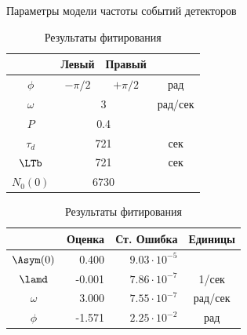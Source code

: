 \documentclass{report}
\newcommand{\vp}[2]{{#1}\cdot 10^{#2}}
\newcommand{\LTd}{\tau_d}
\begin{document}
\begin{table}[h]
  \begin{minipage}[t]{.5\linewidth}
    \centering
    \caption{Параметры модели частоты событий детекторов\label{tbl:DetCntRtParam}}
    \begin{tabular}[t]{cccc}
      \hline
      &   Левый   &     Правый     &  \\ \hline
      $\phi$  & $-\pi/2$ &   $+\pi/2$    &   рад   \\
      $\omega$ &  \multicolumn{2}{c}{3}   & рад/сек \\
      $P$    & \multicolumn{2}{c}{0.4}  &  \\
      $\LTd$  & \multicolumn{2}{c}{721}  &   сек   \\
      $\LTb$  & \multicolumn{2}{c}{721}  &   сек   \\
      $N_0(0)$ & \multicolumn{2}{c}{6730} &  \\ \hline
    \end{tabular}
  \end{minipage}%
  \begin{minipage}[t]{.5\linewidth}
    \centering
    \caption{Результаты фитирования\label{tbl:FitRes}}
    \begin{tabular}[t]{crrc}
      \hline
      & Оценка &             Ст. Ошибка &  Единицы   \\ \hline
      $\Asym(0)$ &   0.400 & $\vp{9.03}{-5}$ &         \\
      $\lamd$   &  -0.001 & $\vp{7.86}{-7}$ &  1/сек  \\
      $\omega$  &   3.000 & $\vp{7.55}{-7}$ & рад/сек \\
      $\phi$   &  -1.571 & $\vp{2.25}{-2}$ &   рад   \\ \hline
    \end{tabular}
  \end{minipage}
\end{table}
\end{document}
